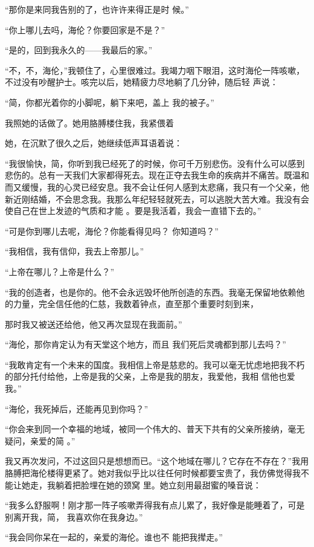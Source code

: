 \documentclass{article}
\begin{document}
“那你是来同我告别的了，也许许来得正是时
候。” 

“你上哪儿去吗，海伦？你要回家是不是？”


“是的，回到我永久的——我最后的家。” 

“不，不，海伦，”我顿住了，心里很难过。我竭力咽下眼泪，这时海伦一阵咳嗽，不过没有吵醒护士。咳完以后，她精疲力尽地躺了几分钟，随后轻
声说： 

“简，你都光着你的小脚呢，躺下来吧，盖上
我的被子。” 

我照她的话做了。她用胳膊楼住我，我紧偎着

\newpage
她，在沉默了很久之后，她继续低声耳语着说： 

“我很愉快，简，你听到我已经死了的时候，你可千万别悲伤。没有什么可以感到悲伤的。总有一天我们大家都得死去。现在正夺去我生命的疾病并不痛苦。既温和而又缓慢，我的心灵已经安息。我不会让任何人感到太悲痛，我只有一个父亲，他新近刚结婚，不会思念我。我那么年纪轻轻就死去，可以逃脱大苦大难。我没有会使自己在世上发迹的气质和才能
。要是我活着，我会一直错下去的。” 

“可是你到哪儿去呢，海伦？你能看得见吗？
你知道吗？” 


“我相信，我有信仰，我去上帝那儿。” 


“上帝在哪儿？上帝是什么？” 

“我的创造者，也是你的。他不会永远毁坏他所创造的东西。我毫无保留地依赖他的力量，完全信任他的仁慈，我数着钟点，直至那个重要时刻到来，

\newpage
那时我又被送还给他，他又再次显现在我面前。” 

“海伦，那你肯定认为有天堂这个地方，而且
我们死后灵魂都到那儿去吗？” 

“我敢肯定有一个未来的国度。我相信上帝是慈悲的。我可以毫无忧虑地把我不朽的部分托付给他，上帝是我的父亲，上帝是我的朋友，我爱他，我相
信他也爱我。” 


“海伦，我死掉后，还能再见到你吗？” 

“你会来到同一个幸福的地域，被同一个伟大的、普天下共有的父亲所接纳，毫无疑问，亲爱的简
。” 

我又再次发问，不过这回只是想想而已。“这个地域在哪儿？它存在不存在？”我用胳膊把海伦楼得更紧了。她对我似乎比以往任何时候都要宝贵了，我仿佛觉得我不能让她走，我躺着把脸埋在她的颈窝
里。她立刻用最甜蜜的嗓音说： 

\newpage

“我多么舒服啊！刚才那一阵子咳嗽弄得我有点儿累了，我好像是能睡着了，可是别离开我，简，
我喜欢你在我身边。” 

“我会同你呆在一起的，亲爱的海伦。谁也不
能把我撵走。” 
\end{document}
